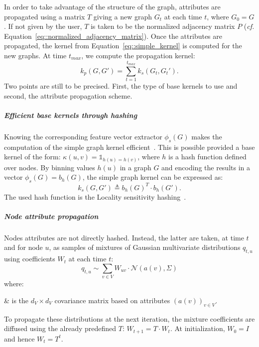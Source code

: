                 In order to take advantage of the structure of the graph, attributes are propagated using a matrix $T$ giving a new graph $G_t$ at each time $t$, where $G_0 = G$.
                If not given by the user, \(T\) is taken to be the normalized adjacency matrix $P$ (\textit{cf.} Equation~\ref{eq::normalized_adjacency_matrix}).
                Once the attributes are propagated, the kernel from Equation~\ref{eq::simple_kernel} is computed for the new graphs.
                At time $t_{max}$, we compute the propagation kernel:
                \begin{equation}
                    \label{eq::propagation_kernel}
                    k_p(G, G') = \sum_{t=1}^{t_{max}} k_s(G_t, G_t').
                \end{equation}
                Two points are still to be precised.
                First, the type of base kernels to use and second, the attribute propagation scheme.\\

                \subparagraph{Efficient base kernels through hashing}
                    Knowing the corresponding feature vector extractor $\phi_s(G)$ makes the computation of the simple graph kernel efficient~\parencite{shervashidze2011weisfeiler,neumann2016propagation}.
                    This is possible provided a base kernel of the form: $\kappa(u, v) = \mathbb{1}_{h(u) = h(v)}$, where $h$ is a hash function defined over nodes.
                    By binning values $h(u)$ in a graph $G$ and encoding the results in a vector $\phi_s(G) = b_h(G)$, the simple graph kernel can be expressed as:
                    \begin{equation}
                        \label{eq::simple_kernel_binning}
                        k_s(G, G') \triangleq b_h(G)^T\cdot b_h(G').
                    \end{equation}
                    The used hash function is the Locality sensitivity hashing~\parencite{neumann2016propagation}.\\

                \subparagraph{Node attribute propagation}
                    Nodes attributes are not directly hashed.
                    Instead, the latter are taken, at time $t$ and for node $u$, as samples of mixtures of Gaussian multivariate distributions $q_{t, u}$ using coefficients $W_t$ at each time $t$:
                    \begin{equation}
                        \label{eq::attribute_samples}
                        q_{t, u} \sim \sum_{v \in V} W_{uv}\cdot \mathscr{N}(a(v), \Sigma)
                    \end{equation}
                    where:
                    \begin{conditions}
                        \Sigma & is the $d_V \times d_V$ covariance matrix based on attributes $\left(a(v)\right)_{v\in V}$.
                    \end{conditions}
                    To propagate these distributions at the next iteration, the mixture coefficients are diffused using the already predefined $T$: $W_{t+1} = T\cdot W_t$.
                    At initialization, $W_0 = I$ and hence $W_t= T^t$.

